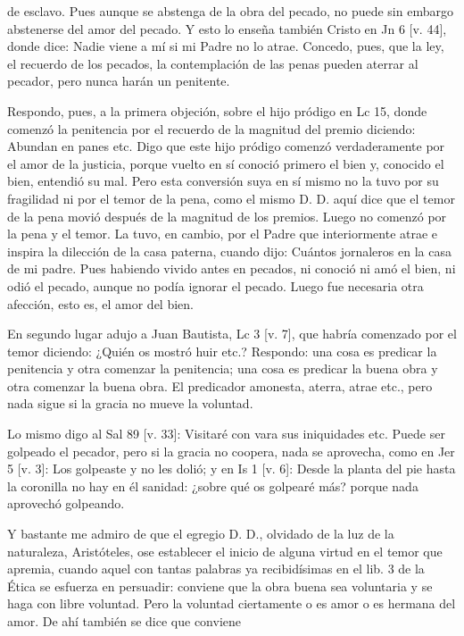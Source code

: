 de esclavo. Pues aunque se abstenga de la obra del pecado, no puede sin embargo abstenerse del amor del pecado. Y esto lo enseña también Cristo en Jn 6 [v. 44], donde dice: Nadie viene a mí si mi Padre no lo atrae. Concedo, pues, que la ley, el recuerdo de los pecados, la contemplación de las penas pueden aterrar al pecador, pero nunca harán un penitente.

Respondo, pues, a la primera objeción, sobre el hijo pródigo en Lc 15, donde comenzó la penitencia por el recuerdo de la magnitud del premio diciendo: Abundan en panes etc. Digo que este hijo pródigo comenzó verdaderamente por el amor de la justicia, porque vuelto en sí conoció primero el bien y, conocido el bien, entendió su mal. Pero esta conversión suya en sí mismo no la tuvo por su fragilidad ni por el temor de la pena, como el mismo D. D. aquí dice que el temor de la pena movió después de la magnitud de los premios. Luego no comenzó por la pena y el temor. La tuvo, en cambio, por el Padre que interiormente atrae e inspira la dilección de la casa paterna, cuando dijo: Cuántos jornaleros en la casa de mi padre. Pues habiendo vivido antes en pecados, ni conoció ni amó el bien, ni odió el pecado, aunque no podía ignorar el pecado. Luego fue necesaria otra afección, esto es, el amor del bien.

En segundo lugar adujo a Juan Bautista, Lc 3 [v. 7], que habría comenzado por el temor diciendo: ¿Quién os mostró huir etc.? Respondo: una cosa es predicar la penitencia y otra comenzar la penitencia; una cosa es predicar la buena obra y otra comenzar la buena obra. El predicador amonesta, aterra, atrae etc., pero nada sigue si la gracia no mueve la voluntad.

Lo mismo digo al Sal 89 [v. 33]: Visitaré con vara sus iniquidades etc. Puede ser golpeado el pecador, pero si la gracia no coopera, nada se aprovecha, como en Jer 5 [v. 3]: \marginpar{\small[363]} Los golpeaste y no les dolió; y en Is 1 [v. 6]: Desde la planta del pie hasta la coronilla no hay en él sanidad: ¿sobre qué os golpearé más? porque nada aprovechó golpeando.

Y bastante me admiro de que el egregio D. D., olvidado de la luz de la naturaleza, Aristóteles, ose establecer el inicio de alguna virtud en el temor que apremia, cuando aquel con tantas palabras ya recibidísimas en el lib. 3 de la Ética se esfuerza en persuadir: conviene que la obra buena sea voluntaria y se haga con libre voluntad. Pero la voluntad ciertamente o es amor o es hermana del amor. De ahí también se dice que conviene

